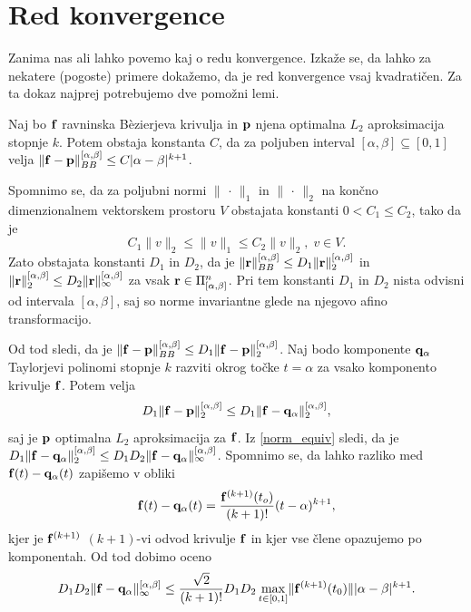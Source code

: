 
\section{Red konvergence}

Zanima nas ali lahko povemo kaj o redu konvergence. Izkaže se, da lahko za nekatere (pogoste) primere dokažemo, da je red konvergence vsaj kvadratičen. Za ta dokaz najprej potrebujemo dve pomožni lemi.

\begin{lema}\label{prvalema}
Naj bo ${\bf f}$ ravninska B\`{e}zierjeva krivulja in ${\bf p}$ njena optimalna $L_2$ aproksimacija stopnje $k$. Potem obstaja konstanta $C$, da za poljuben interval $[\alpha,\beta]\subseteq[0,1]$ velja $\lVert {\bf f} - {\bf p} \rVert _{BB}^{[\alpha,\beta]} \leq C |\alpha - \beta|^{k+1}$.
\end{lema}
\proof
Spomnimo se, da za poljubni normi $\lVert\, \cdot\, \rVert _1$ in $\lVert\, \cdot \,\rVert _2$ na končno dimenzionalnem vektorskem prostoru $V$ obstajata konstanti $0 < C_1 \leq C_2$, tako da je 
\begin{equation}\label{norm_equiv}
C_1 \lVert v\rVert _2 \leq \lVert v\rVert _1 \leq C_2 \lVert v\rVert _2, \; v\in V.
\end{equation}
Zato obstajata konstanti $D_1$ in $D_2$, da je $\lVert {\bf r}\rVert _{BB}^{[\alpha,\beta]} \leq D_1 \lVert {\bf r}\rVert _2^{[\alpha,\beta]}$ in $\lVert {\bf r}\rVert _{2}^{[\alpha,\beta]} \leq D_2 \lVert {\bf r}\rVert _\infty^{[\alpha,\beta]}$ za vsak ${\bf r}\in  \Pi _{[\alpha,\beta]}^n$. Pri tem konstanti $D_1$ in $D_2$ nista odvisni od intervala $[\alpha,\beta]$, saj so norme invariantne glede na njegovo afino transformacijo.

Od tod sledi, da je 
$\lVert {\bf f} - {\bf p} \rVert _{BB}^{[\alpha,\beta]} \leq D_1 \lVert {\bf f} - {\bf p} \rVert _{2}^{[\alpha,\beta]}$. Naj bodo komponente ${\bf q}_\alpha$ Taylorjevi polinomi stopnje $k$ razviti okrog točke $t = \alpha$ za vsako komponento krivulje ${\bf f}$. Potem velja
$$
D_1 \lVert {\bf f} - {\bf p} \rVert _{2}^{[\alpha,\beta]} \leq D_1 \lVert {\bf f} - {\bf q}_\alpha \rVert _{2}^{[\alpha,\beta]},
$$
saj je ${\bf p}$ optimalna $L_2$ aproksimacija za ${\bf f}$. Iz \ref{norm_equiv} sledi, da je 
$
D_1 \lVert {\bf f} - {\bf q}_\alpha \rVert _{2}^{[\alpha,\beta]} \leq D_1D_2 \lVert {\bf f} - {\bf q}_\alpha \rVert _{\infty}^{[\alpha,\beta]}
$. Spomnimo se, da lahko razliko med ${\bf f}(t) - {\bf q}_\alpha(t)$ zapišemo v obliki
$$
{\bf f}(t) - {\bf q}_\alpha(t) = \frac{{\bf f}^{(k+1)}(t_o)}{(k+1)!}(t-\alpha)^{k+1},
$$
kjer je ${\bf f}^{(k+1)}$ $(k+1)$-vi odvod krivulje ${\bf f}$ in kjer vse člene opazujemo po komponentah. Od tod dobimo oceno
$$
D_1D_2 \lVert {\bf f} - {\bf q}_\alpha \rVert _{\infty}^{[\alpha,\beta]} \leq
\frac{\sqrt{2}}{(k+1)!}D_1D_2\max _{t\in [0,1]} \lVert {\bf f}^{(k+1)}(t_0) \rVert |\alpha - \beta|^{k+1}.
$$
\endproof

